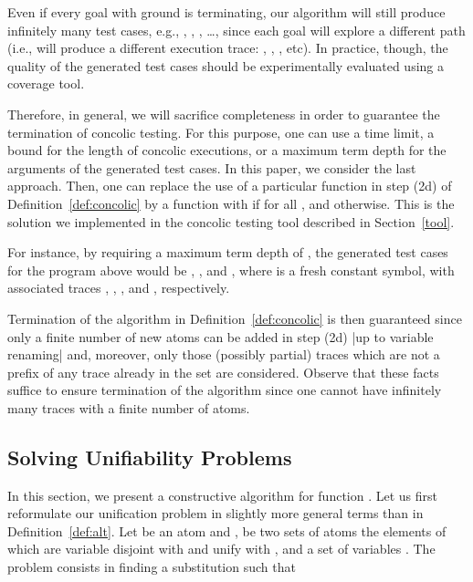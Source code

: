 \documentclass[fleqn]{tlp}
\begin{document}
Even if every goal  with  ground is terminating, our
algorithm will still produce infinitely many test cases, e.g.,
, , , \ldots, since each goal will
explore a different path (i.e., will produce a different execution
trace: , ,
, etc). In practice, though, the
quality of the generated test cases should be experimentally evaluated
using a coverage tool.

Therefore, in general, we will sacrifice completeness in order to
guarantee the termination of concolic testing. For this purpose, one
can use a time limit, a bound for the length of concolic executions,
or a maximum term depth for the arguments of the generated test
cases. In this paper, we consider the last approach.
Then, one can replace the use of a particular function  in step
(2d) of Definition~\ref{def:concolic} by a function  with
 if 
for all , and  otherwise.
This is the solution we implemented in the concolic testing tool
described in Section~\ref{tool}.

For instance, by requiring a maximum term depth of , the
generated test cases for the program  above would be ,
,  and , where  is a fresh constant
symbol, with associated traces , ,
, and , respectively.

Termination of the algorithm in Definition~\ref{def:concolic} is then
guaranteed since only a finite number of new atoms can be added in
step (2d) |up to variable renaming| and, moreover, only those (possibly
partial) traces which are not a prefix of any trace already in the set
 are considered. Observe that these facts suffice to
ensure termination of the algorithm since one cannot have infinitely
many traces with a finite number of atoms.

\subsection{Solving Unifiability Problems} \label{sec:unif}

In this section, we present a constructive algorithm for function .
Let us first reformulate our unification problem in slightly more
general terms than in Definition~\ref{def:alt}. Let  be an atom and
,  be two sets of atoms the elements of which are
variable disjoint with  and unify with , and a set of variables
. The problem consists in finding a substitution  such that
\end{document}
